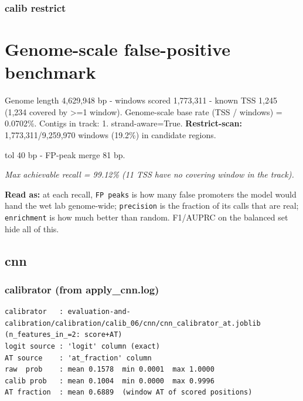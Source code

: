 \documentclass[10pt]{article}
\begin{document}
\subsubsection*{calib \textperiodcentered{} restrict}
\section*{Genome-scale false-positive benchmark}

Genome length 4,629,948 bp - windows scored 1,773,311 - known TSS 1,245 (1,234 covered by >=1 window). Genome-scale base rate (TSS / windows) = 0.0702\%. Contigs in track: 1. strand-aware=True. \textbf{Restrict-scan:} 1,773,311/9,259,970 windows (19.2\%) in candidate regions.

tol 40 bp - FP-peak merge 81 bp.

\begin{center}
\end{center}

{\itshape Max achievable recall = 99.12\% (11 TSS have no covering window in the track).}

\textbf{Read as:} at each recall, \texttt{FP peaks} is how many false promoters the model would hand the wet lab genome-wide; \texttt{precision} is the fraction of its calls that are real; \texttt{enrichment} is how much better than random. F1/AUPRC on the balanced set hide all of this.

\subsection*{cnn}

\subsubsection*{calibrator (from apply\_cnn.log)}
\begin{verbatim}
calibrator   : evaluation-and-calibration/calibration/calib_06/cnn/cnn_calibrator_at.joblib  (n_features_in_=2: score+AT)
logit source : 'logit' column (exact)
AT source    : 'at_fraction' column
raw  prob    : mean 0.1578  min 0.0001  max 1.0000
calib prob   : mean 0.1004  min 0.0000  max 0.9996
AT fraction  : mean 0.6889  (window AT of scored positions)
\end{verbatim}
\end{document}
